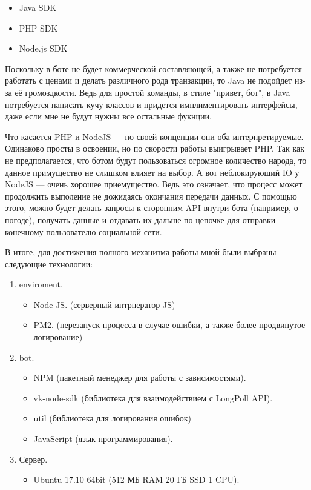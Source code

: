 \documentclass[bachelor, och, coursework, times]{SCWorks}
\begin{document}
\begin{itemize}
  \item Java SDK
  \item PHP SDK
  \item Node.js SDK
\end{itemize}

Поскольку в боте не будет коммерческой составляющей, а также не потребуется работать с ценами и 
делать различного рода транзакции, то Java не подойдет из-за её громоздкости. Ведь для простой команды,
в стиле "привет, бот", в Java потребуется написать кучу классов и придется имплиментировать интерфейсы, 
даже если мне не будут нужны все остальные фукнции.

Что касается PHP и NodeJS \cite{PHP} --- по своей концепции они оба интерпретируемые.
Одинаково просты в освоении, но по скорости работы выигрывает PHP. Так как не предполагается, что
ботом будут пользоваться огромное количество народа, то данное примущество не слишком влияет на выбор.
А вот неблокирующий IO у NodeJS --- очень хорошее приемущество. \cite{IO} Ведь это означает, что процесс может
продолжить выполение не дожидаясь окончания передачи данных. С помощью этого, можно будет делать запросы
к сторонним API внутри бота (например, о погоде), получать данные и отдавать их дальше по цепочке для
отправки конечному пользователю социальной сети.


В итоге, для достижения полного механизма работы мной были выбраны следующие технологии:
\begin{enumerate}
 
  \item enviroment.
  \begin {itemize}
	\item Node JS. (серверный интрператор JS)
	\item PM2. (перезапуск процесса в случае ошибки, а также более продвинутое логирование)
  \end {itemize}
  \item bot.
  \begin {itemize} 
  	\item NPM (пакетный менеджер для работы с зависимостями).
  	\item vk-node-sdk (библиотека для взаимодействием с LongPoll API).
  	\item util (библиотека для логирования ошибок)
  	\item JavaScript (язык программирования).
  \end {itemize}
  \item Сервер.
  \begin {itemize}
	\item Ubuntu 17.10 64bit (512 МБ RAM 20 ГБ SSD 1 CPU).
  \end {itemize} 
\end{enumerate}
\end{document}
